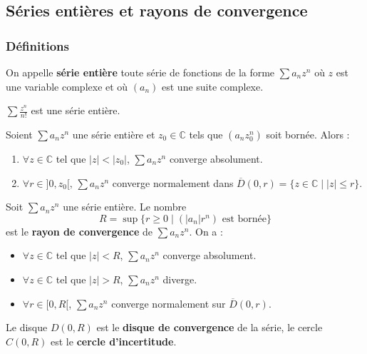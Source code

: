 




  \subsection{Séries entières et rayons de convergence}

  \subsubsection{Définitions}


  \begin{definition}
    On appelle \textbf{série entière} toute série de fonctions de la forme $\sum a_n z^n$ où $z$ est une variable complexe et où $(a_n)$ est une suite complexe.
  \end{definition}

  \begin{example}
    $\sum \frac{z^n}{n!}$ est une série entière.
  \end{example}

  \begin{lemma}[Abel]
    Soient $\sum a_n z^n$ une série entière et $z_0 \in \mathbb{C}$ tels que $(a_n z_0^n)$ soit bornée. Alors :
    \begin{enumerate}[label=(\roman*)]
      \item $\forall z \in \mathbb{C}$ tel que $|z| < |z_0|$, $\sum a_n z^n$ converge absolument.
      \item $\forall r \in ]0,z_0[, \, \sum a_n z^n$ converge normalement dans $\overline{D}(0, r) = \{ z \in \mathbb{C} \mid |z| \leq r \}$.
    \end{enumerate}
  \end{lemma}

  \begin{definition}
    Soit $\sum a_n z^n$ une série entière. Le nombre
    \[ R = \sup \{ r \geq 0 \mid (|a_n|r^n) \text{ est bornée} \} \]
    est le \textbf{rayon de convergence} de $\sum a_n z^n$. On a :
    \begin{itemize}
      \item $\forall z \in \mathbb{C}$ tel que $|z| < R$, $\sum a_n z^n$ converge absolument.
      \item $\forall z \in \mathbb{C}$ tel que $|z| > R$, $\sum a_n z^n$ diverge.
      \item $\forall r \in [0,R[$, $\sum a_n z^n$ converge normalement sur $\overline{D}(0,r)$.
    \end{itemize}
    Le disque $D(0,R)$ est le \textbf{disque de convergence} de la série, le cercle $C(0,R)$ est le \textbf{cercle d'incertitude}.
  \end{definition}

